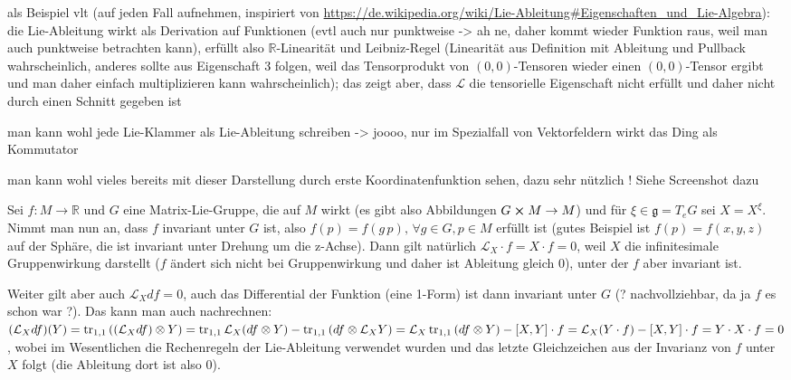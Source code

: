 \documentclass[../H_Analysis_main.tex]{subfiles}
\begin{document}
als Beispiel vlt (auf jeden Fall aufnehmen, inspiriert von \url{https://de.wikipedia.org/wiki/Lie-Ableitung#Eigenschaften_und_Lie-Algebra}): die Lie-Ableitung wirkt als Derivation auf Funktionen (evtl auch nur punktweise -> ah ne, daher kommt wieder Funktion raus, weil man auch punktweise betrachten kann), erfüllt also $\mathbb{R}$-Linearität und Leibniz-Regel (Linearität aus Definition mit Ableitung und Pullback wahrscheinlich, anderes sollte aus Eigenschaft 3 folgen, weil das Tensorprodukt von $(0, 0)$-Tensoren wieder einen $(0, 0)$-Tensor ergibt und man daher einfach multiplizieren kann wahrscheinlich); das zeigt aber, dass $\mathcal{L}$ die tensorielle Eigenschaft nicht erfüllt und daher nicht durch einen Schnitt gegeben ist


man kann wohl jede Lie-Klammer als Lie-Ableitung schreiben -> joooo, nur im Spezialfall von Vektorfeldern wirkt das Ding als Kommutator


man kann wohl vieles bereits mit dieser Darstellung durch erste Koordinatenfunktion sehen, dazu sehr nützlich ! Siehe Screenshot dazu


\begin{bsp}
Sei $f: M \rightarrow \mathbb{R}$ und $G$ eine Matrix-Lie-Gruppe, die auf $M$ wirkt (es gibt also Abbildungen $G \cross M \rightarrow M$) und für $\xi \in \mathfrak{g} = T_e G$ sei $X = X^\xi$. Nimmt man nun an, dass $f$ invariant unter $G$ ist, also $f(p) = f(g \, p), \, \forall g \in G, p \in M$ erfüllt ist (gutes Beispiel ist $f(p) = f(x, y, z)$ auf der Sphäre, die ist invariant unter Drehung um die z-Achse). Dann gilt natürlich $\mathcal{L}_X \cdot f = X \cdot f = 0$, weil $X$ die infinitesimale Gruppenwirkung darstellt ($f$ ändert sich nicht bei Gruppenwirkung und daher ist Ableitung gleich 0), unter der $f$ aber invariant ist.

Weiter gilt aber auch $\mathcal{L}_X df = 0$, auch das Differential der Funktion (eine 1-Form) ist dann invariant unter $G$ (? nachvollziehbar, da ja $f$ es schon war ?). Das kann man auch nachrechnen: $\qty(\mathcal{L}_X df)(Y) = \tr_{1, 1}\qty(\qty(\mathcal{L}_X df) \otimes Y) = \tr_{1, 1}\mathcal{L}_X \qty(df \otimes Y) - \tr_{1, 1}\qty(df \otimes \mathcal{L}_X Y) = \mathcal{L}_X \tr_{1, 1}\qty(df \otimes Y) - \qty[X, Y] \cdot f = \mathcal{L}_X\qty(Y \cdot f) - \qty[X, Y] \cdot f = Y \cdot X \cdot f = 0$, wobei im Wesentlichen die Rechenregeln der Lie-Ableitung verwendet wurden und das letzte Gleichzeichen aus der Invarianz von $f$ unter $X$ folgt (die Ableitung dort ist also 0).
\end{bsp}
\end{document}

